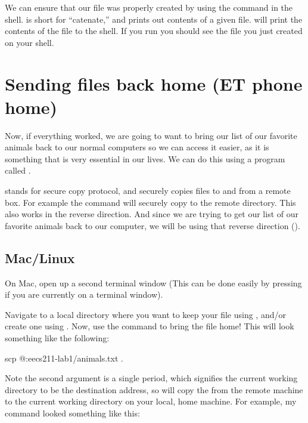 \documentclass{tufte-handout}
\begin{document}
We can ensure that our file was properly created by using the
 command in the shell.  is short for
``catenate,'' and prints out contents of a given file.   will print the contents of the file to the shell. If
you run  you should see the file you just
created on your shell.

\section{Sending files back home (ET phone home)}

Now, if everything worked, we are going to want to bring our list of our
favorite animals back to our normal computers so we can access it
easier, as it is something that is very essential in our lives.  We can
do this using a program called .

 stands for secure copy protocol, and securely copies
files to and from a remote box.  For example the command  will securely copy
 to the remote directory. This also works in the
reverse direction.  And since we are trying to get our list of our
favorite animals back to our computer, we will be using that reverse
direction ().

\subsection{Mac/Linux}

On Mac, open up a second terminal window (This can be done easily by
pressing  if you are currently on a terminal window).

Navigate to a local directory where you want to keep your
 file using , and/or create one using
.  Now, use the  command to bring
the file home!  This will look something like the following:

\begin{CmdLine}
  \prompt scp @:eecs211-lab1/animals.txt .
\end{CmdLine}

\noindent
Note the second argument is a single period, which signifies the current
working directory to be the destination address, so  will copy the
 from the remote machine to the current working
directory on your local, home machine. For example, my  command
looked something like this:
\end{document}
